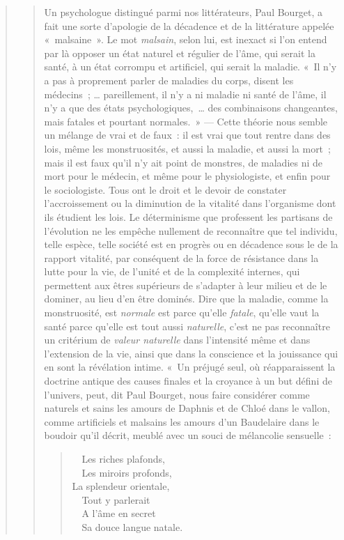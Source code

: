 \documentclass[french,twoside]{book} %
\begin{document}
\begin{verse}
\begin{verse}
Un psychologue distingué parmi nos littérateurs, Paul Bourget, a fait une sorte d’apologie de la décadence et de la littérature appelée « malsaine ». Le mot \emph{malsain}, selon lui, est inexact si l’on entend par là opposer un état naturel et régulier de l’âme, qui serait la santé, à un état corrompu et artificiel, qui serait la maladie. « Il n’y a pas à proprement parler de maladies du corps, disent les médecins ; … pareillement, il n’y a ni maladie ni santé de l’âme, il n’y a que des états psychologiques, … des combinaisons changeantes, mais fatales et pourtant normales. » — Cette théorie nous semble un mélange de vrai et de faux : il est vrai que tout rentre dans des lois, même les monstruosités, et aussi la maladie, et aussi la mort ; mais il est faux qu’il n’y ait point de monstres, de maladies ni de mort pour le médecin, et même pour le physiologiste, et enfin pour le sociologiste. Tous ont le droit et le devoir de constater l’accroissement ou la diminution de la vitalité dans l’organisme dont ils étudient les lois. Le déterminisme que professent les partisans de l’évolution ne les empêche nullement de reconnaître que tel individu, telle espèce, telle société est en progrès ou en décadence sous le de la rapport vitalité, par conséquent de la force de résistance dans la lutte pour la vie, de l’unité et de la complexité internes, qui permettent aux êtres supérieurs de s’adapter à leur milieu et de le dominer, au lieu d’en être dominés. Dire que la maladie, comme la monstruosité, est \emph{normale} est parce qu’elle \emph{fatale}, qu’elle vaut la santé parce qu’elle est tout aussi \emph{naturelle}, c’est ne pas reconnaître un critérium de \emph{valeur naturelle} dans l’intensité même et dans l’extension de la vie, ainsi que dans la conscience et la jouissance qui en sont la révélation intime. « Un préjugé seul, où réapparaissent la doctrine antique des causes finales et la croyance à un but défini de l’univers, peut, dit Paul Bourget, nous faire considérer comme naturels et sains les amours de Daphnis et de Chloé dans le vallon, comme artificiels et malsains les amours d’un Baudelaire dans le boudoir qu’il décrit, meublé avec un souci de mélancolie sensuelle :\par


\begin{verse}
  Les riches plafonds,\\
  Les miroirs profonds,\\
La splendeur orientale,\\
  Tout y parlerait\\
  A l’âme en secret\\
  Sa douce langue natale.\\
\end{verse}


\end{verse}
\end{verse}
\end{document}
